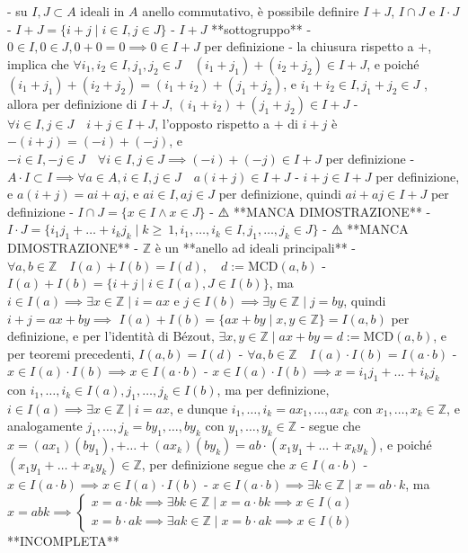 - su $I, J \subset A$ ideali in $A$ anello commutativo, è possibile definire $I + J$, $I \cap J$ e $I \cdot J$
  - $I + J = \{i + j \mid i \in I, j \in J\}$
    - $I + J$ **sottogruppo**
      - \( 0 \in I, 0 \in J, 0+0=0 \implies 0 \in I + J \) per definizione
      - la chiusura rispetto a $+$, implica che $\forall i_1, i_2 \in I, j_1, j_2 \in J \quad (i_1 + j_1) + (i_2 + j_2) \in I + J$, e poiché $(i_1 + j_1) + (i_2 + j_2) = (i_1 + i_2) + (j_1 + j_2)$, e $i_1 + i_2 \in I, j_1 + j_2 \in J$ , allora per definizione di $I + J$, $(i_1 + i_2) + (j_1 + j_2) \in I + J$
      - $\forall i \in I, j \in J \quad i + j \in I + J$, l'opposto rispetto a $+$ di $i + j$ è $- (i + j) = (-i) + (-j)$, e $-i \in I, -j \in J \quad \forall i \in I, j \in J \implies (-i) + (-j) \in I + J$ per definizione
    - $A \cdot I \subset I \implies \forall a \in A, i \in I, j \in J \quad a(i + j) \in I + J$
      - $i + j \in I + J$ per definizione, e $a(i + j) = ai + aj$, e $ai \in I, aj \in J$ per definizione, quindi $ai + aj \in I + J$ per definizione
  - $I \cap J = \{x \in I \land x \in J\}$
    - ⚠️ **MANCA DIMOSTRAZIONE**
  - $I \cdot J = \{i_1 j_1 + \ldots + i_k j_k \mid k \ge \ 1, i_1 , \ldots , i_k \in I, j_1 , \ldots , j_k \in J \}$
    - ⚠️ **MANCA DIMOSTRAZIONE**
- $\mathbb{Z}$ è un **anello ad ideali principali**
  - $\forall a, b \in \mathbb{Z} \quad I(a) + I(b) = I(d), \quad d:= \textrm{MCD}(a, b)$
    - \( I(a)+I(b)=\{i+j \mid i \in I(a), J \in I(b) \} \), ma $i \in I(a) \implies \exists x \in \mathbb{Z} \mid i = ax$ e $j \in I(b) \implies \exists y \in \mathbb{Z} \mid j = by$, quindi $i + j = ax + by \implies$ \( I(a)+I(b)=\{a x+b y \mid x, y \in \mathbb{Z}\} = I(a, b) \) per definizione, e per l'identità di Bézout, $\exists x, y \in \mathbb{Z} \mid ax + by = d := \textrm{MCD}(a, b)$, e per teoremi precedenti, $I(a, b) = I(d)$
  - \( \forall a, b \in \mathbb{Z} \quad I(a) \cdot I(b)=I(a \cdot b) \)
    - \( x \in I(a) \cdot I(b) \implies x \in I(a \cdot b) \)
      - $x \in I(a) \cdot I(b) \implies x = i_1 j_1 + \ldots + i_k j_k$ con $i_1 , \ldots , i_k \in I(a), j_1 , \ldots , j_k \in I(b)$, ma per definizione, $i \in I(a) \implies \exists x \in \mathbb{Z} \mid i = ax$, e dunque $i_1, \ldots, i_k = ax_1, \ldots, ax_k$ con $x_1, \ldots, x_k \in \mathbb{Z}$, e analogamente $j_1, \ldots, j_k = by_1, \ldots, by_k$ con $y_1, \ldots, y_k \in \mathbb{Z}$
      - segue che $x = (ax_1)(by_1),+\ldots+ (ax_k)(by_k) = ab\cdot(x_1y_1+ \ldots+ x_ky_k)$, e poiché $(x_1y_1+ \ldots+ x_ky_k) \in \mathbb{Z}$, per definizione segue che $x \in I(a\cdot b)$
    - \( x \in I(a \cdot b)  \implies x \in I(a) \cdot I(b)\)
      - $x \in I(a \cdot b) \implies \exists k \in \mathbb{Z} \mid x = ab \cdot k$, ma \( x=a b k \implies\left\{\begin{array}{l}x=a \cdot b k \implies \exists bk \in \mathbb{Z} \mid x = a \cdot bk \implies x \in I(a) \\ x=b \cdot a k \implies \exists ak \in \mathbb{Z} \mid x = b \cdot ak \implies x \in I(b)\end{array}\right. \) **INCOMPLETA**
   

